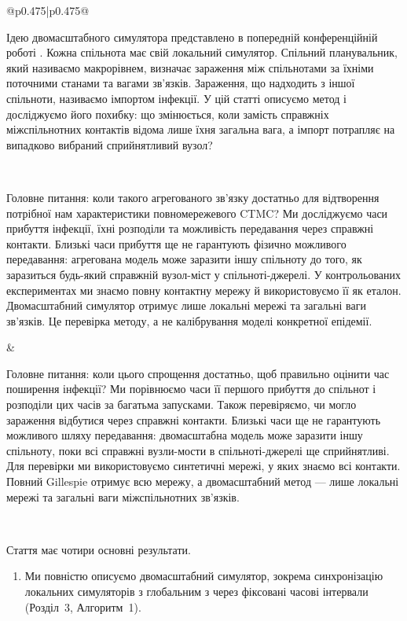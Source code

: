 \documentclass[11pt]{article}
\begin{document}
\begin{longtable}{@{}p{0.475\textwidth}|p{0.475\textwidth}@{}}
\begin{minipage}[t]{\linewidth}
Ідею двомасштабного симулятора представлено в попередній конференційній роботі \citep{kuryliak2025towards}. Кожна спільнота має свій локальний симулятор. Спільний планувальник, який називаємо макрорівнем, визначає зараження між спільнотами за їхніми поточними станами та вагами зв'язків. Зараження, що надходить з іншої спільноти, називаємо імпортом інфекції. У цій статті описуємо метод і досліджуємо його похибку: що змінюється, коли замість справжніх міжспільнотних контактів відома лише їхня загальна вага, а імпорт потрапляє на випадково вибраний сприйнятливий вузол?
\end{minipage} \\[5mm]
\begin{minipage}[t]{\linewidth}
Головне питання: коли такого агрегованого зв'язку достатньо для відтворення потрібної нам характеристики повномережевого CTMC? Ми досліджуємо часи прибуття інфекції, їхні розподіли та можливість передавання через справжні контакти. Близькі часи прибуття ще не гарантують фізично можливого передавання: агрегована модель може заразити іншу спільноту до того, як заразиться будь-який справжній вузол-міст у спільноті-джерелі. У контрольованих експериментах ми знаємо повну контактну мережу й використовуємо її як еталон. Двомасштабний симулятор отримує лише локальні мережі та загальні ваги зв'язків. Це перевірка методу, а не калібрування моделі конкретної епідемії.
\end{minipage} &
\begin{minipage}[t]{\linewidth}
Головне питання: коли цього спрощення достатньо, щоб правильно оцінити час поширення інфекції? Ми порівнюємо часи її першого прибуття до спільнот і розподіли цих часів за багатьма запусками. Також перевіряємо, чи могло зараження відбутися через справжні контакти. Близькі часи ще не гарантують можливого шляху передавання: двомасштабна модель може заразити іншу спільноту, поки всі справжні вузли-мости в спільноті-джерелі ще сприйнятливі. Для перевірки ми використовуємо синтетичні мережі, у яких знаємо всі контакти. Повний Gillespie отримує всю мережу, а двомасштабний метод --- лише локальні мережі та загальні ваги міжспільнотних зв'язків.
\end{minipage} \\[5mm]
\begin{minipage}[t]{\linewidth}
Стаття має чотири основні результати.
\begin{enumerate}
\item Ми повністю описуємо двомасштабний симулятор, зокрема синхронізацію локальних симуляторів з глобальним з через фіксовані часові інтервали (Розділ~3, Алгоритм~1).

\end{enumerate}
\end{minipage}
\end{longtable}
\end{document}
